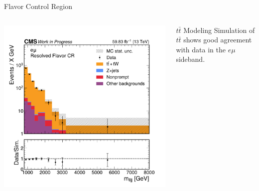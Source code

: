 \documentclass[aspectratio=169]{beamer}
\begin{document}
\begin{frame}{Flavor Control Region}
  \begin{columns}
    \begin{column}{0.50\textwidth}
      \centering
      \includegraphics[width=\textwidth]{../figures/histograms/mass-fourobject-flavorcr.pdf}
    \end{column}
    \begin{column}{0.50\textwidth}
        \vspace*{-15mm}
        \centering
        \resizebox{\columnwidth}{!}{%
        }
      \vspace{1ex} 
      \begin{block}{$t\bar{t}$ Modeling}
        Simulation of $t\bar{t}$ shows good agreement with data in the $e\mu$ sideband.
      \end{block}
    \end{column}
  \end{columns}
\end{frame}
\end{document}

